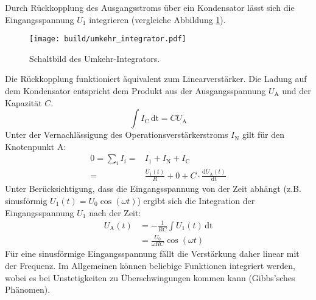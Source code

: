 Durch Rückkopplung des Ausgangsstroms über ein Kondensator lässt sich die
Eingangsspannung $U_1$ integrieren (vergleiche Abbildung \ref{fig:integrator}).
\begin{figure}[ht]
		\centering
		\texttt{[image: build/umkehr\_integrator.pdf]}
		\caption{Schaltbild des Umkehr-Integrators.\cite{anleitung}}
		\label{fig:integrator}
\end{figure}
Die Rückkopplung funktioniert äquivalent zum Linearverstärker.
Die Ladung auf dem Kondensator entspricht dem Produkt aus der Ausgangsspannung
$U_\text{A}$ und der Kapazität $C$.
\begin{equation}
		\int I_\text{C} \, \text{dt} = C U_\text{A}
\end{equation}
Unter der Vernachlässigung des Operationsverstärkerstroms $I_\text{N}$ gilt
für den Knotenpunkt A:
\begin{align}
		0 = \sum_i I_i =& I_1 + I_\text{N} + I_\text{C} \nonumber \\
		=& \frac{U_1(t)}{R} + 0 + C \cdot \frac{\text{d} U_\text{A}(t)}{\text{dt}}
\end{align}
Unter Berücksichtigung, dass die Eingangsspannung von der Zeit abhängt (z.B.
sinusförmig $U_1(t)= U_0 \cos(\omega t)$) ergibt sich die Integration der Eingangsspannung $U_1$ nach der Zeit:
\begin{align}
  U_\text{A}(t) &= - \frac{1}{RC} \int U_\text{1}(t) \, \text{dt} \nonumber \\
                  &= \frac{U_0}{\omega R C} \cos (\omega t) \label{eq:integrator}
\end{align}
Für eine sinusförmige Eingangsspannung fällt die Verstärkung daher linear mit
der Frequenz.
Im Allgemeinen können beliebige Funktionen integriert werden, wobei es bei
Unstetigkeiten zu Überschwingungen kommen kann (Gibbs'sches Phänomen).

